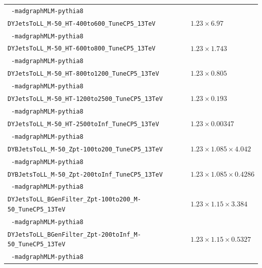 \begin{table}[htbp]
\begin{tabularx}{6.5in}{lX}
    \texttt{  -madgraphMLM-pythia8}                                     &                                   \\
    \texttt{DYJetsToLL\_M-50\_HT-400to600\_TuneCP5\_13TeV}              & $1.23 \times 6.97$                \\
    \texttt{  -madgraphMLM-pythia8}                                     &                                   \\
    \texttt{DYJetsToLL\_M-50\_HT-600to800\_TuneCP5\_13TeV}              & $1.23 \times 1.743$               \\
    \texttt{  -madgraphMLM-pythia8}                                     &                                   \\
    \texttt{DYJetsToLL\_M-50\_HT-800to1200\_TuneCP5\_13TeV}             & $1.23 \times 0.805$               \\
    \texttt{  -madgraphMLM-pythia8}                                     &                                   \\
    \texttt{DYJetsToLL\_M-50\_HT-1200to2500\_TuneCP5\_13TeV}            & $1.23 \times 0.193$               \\
    \texttt{  -madgraphMLM-pythia8}                                     &                                   \\
    \texttt{DYJetsToLL\_M-50\_HT-2500toInf\_TuneCP5\_13TeV}             & $1.23 \times 0.00347$             \\
    \texttt{  -madgraphMLM-pythia8}                                     &                                   \\
    \texttt{DYBJetsToLL\_M-50\_Zpt-100to200\_TuneCP5\_13TeV}            & $1.23 \times 1.085 \times 4.042$  \\
    \texttt{  -madgraphMLM-pythia8}                                     &                                   \\
    \texttt{DYBJetsToLL\_M-50\_Zpt-200toInf\_TuneCP5\_13TeV}            & $1.23 \times 1.085 \times 0.4286$ \\
    \texttt{  -madgraphMLM-pythia8}                                     &                                   \\
    \texttt{DYJetsToLL\_BGenFilter\_Zpt-100to200\_M-50\_TuneCP5\_13TeV} & $1.23 \times 1.15 \times 3.384$   \\
    \texttt{  -madgraphMLM-pythia8}                                     &                                   \\
    \texttt{DYJetsToLL\_BGenFilter\_Zpt-200toInf\_M-50\_TuneCP5\_13TeV} & $1.23 \times 1.15 \times 0.5327$  \\
    \texttt{  -madgraphMLM-pythia8}                                     &                                   \\
    \hline
  \end{tabularx}
\end{table}

